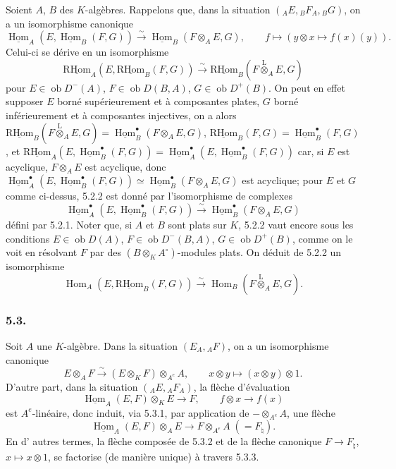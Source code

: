 \documentclass[11pt]{article}
\DeclareMathOperator{\Hom}{Hom}
\newcommand{\R}{\mathrm{R}}\newcommand{\RHomCore}{\mathrm{RHom}}
\newcommand{\ob}{\operatorname{ob}}
\providecommand{\RHom}{\RHomCore}
\providecommand{\uRHom}{\underline{\RHom}}
\providecommand{\uHom}{\underline{\Hom}}
\providecommand{\lten}{\overset{\mathrm L}{\otimes}}
\providecommand{\RHom}{\RHomCore}
\providecommand{\Hom}{\operatorname{Hom}}
\providecommand{\ob}{\operatorname{ob}}
\providecommand{\lten}{\overset{\mathrm L}{\otimes}}
\providecommand{\RHom}{\R\mathcal{H}om}
\providecommand{\lten}{\overset{\mathrm L}{\otimes}}
\providecommand{\R}{\mathrm R}
\providecommand{\lten}{\overset{\mathrm L}{\otimes}}
\providecommand{\lten}{\overset{\mathrm L}{\otimes}}
\providecommand{\lten}{\overset{\mathrm L}{\otimes}}
\providecommand{\RHom}{\RHomCore}
\providecommand{\Hom}{\operatorname{Hom}}
\providecommand{\lten}{\overset{\mathrm L}{\otimes}}
\begin{document}
Soient $A$, $B$ des $K$-algèbres. Rappelons que, dans la situation $({}_AE,{}_BF_A,{}_BG)$, on a un isomorphisme canonique
\begin{equation}\tag{5.2.1}
\uHom_A(E,\uHom_B(F,G))\xrightarrow{\sim}\uHom_B(F\otimes_AE,G),\qquad
f\longmapsto (y\otimes x\longmapsto f(x)(y)).
\end{equation}
Celui-ci se dérive en un isomorphisme
\begin{equation}\tag{5.2.2}
\uRHom_A(E,\uRHom_B(F,G))\xrightarrow{\sim}\uRHom_B(F\lten_AE,G)
\end{equation}
pour $E\in\ob D^-(A)$, $F\in\ob D(B,A)$, $G\in\ob D^+(B)$. On peut en effet supposer $E$ borné supérieurement et à composantes plates, $G$ borné inférieurement et à composantes injectives, on a alors $\uRHom_B(F\lten_AE,G)=\uHom_B^\bullet(F\otimes_AE,G)$, $\uRHom_B(F,G)=\uHom_B^\bullet(F,G)$, et $\uRHom_A(E,\uHom_B^\bullet(F,G))=\uHom_A^\bullet(E,\uHom_B^\bullet(F,G))$ car, si $E$ est acyclique, $F\otimes_AE$ est acyclique, donc $\uHom_A^\bullet(E,\uHom_B^\bullet(F,G))\simeq\uHom_B^\bullet(F\otimes_AE,G)$ est acyclique; pour $E$ et $G$ comme ci-dessus, 5.2.2 est donné par l'isomorphisme de complexes
\[
\uHom_A^\bullet(E,\uHom_B^\bullet(F,G))\xrightarrow{\sim}\uHom_B^\bullet(F\otimes_AE,G)
\]
défini par 5.2.1. Noter que, si $A$ et $B$ sont plats sur $K$, 5.2.2 vaut encore sous les conditions $E\in\ob D(A)$, $F\in\ob D^-(B,A)$, $G\in\ob D^+(B)$, comme on le voit en résolvant $F$ par des $(B\otimes_KA^\circ)$-modules plats. On déduit de 5.2.2 un isomorphisme
\begin{equation}\tag{5.2.3}
\Hom_A(E,\uRHom_B(F,G))\xrightarrow{\sim}\Hom_B(F\lten_AE,G).
\end{equation}

\subsubsection*{5.3.}

Soit $A$ une $K$-algèbre. Dans la situation $(E_A,{}_AF)$, on a un isomorphisme canonique
\begin{equation}\tag{5.3.1}
E\otimes_AF\xrightarrow{\sim}(E\otimes_KF)\otimes_{A^e}A,
\qquad x\otimes y\longmapsto (x\otimes y)\otimes 1.
\end{equation}
D'autre part, dans la situation $({}_AE,{}_AF_A)$, la flèche d'évaluation
\begin{equation}\tag{5.3.2}
\uHom_A(E,F)\otimes_KE\longrightarrow F,
\qquad f\otimes x\longrightarrow f(x)
\end{equation}
est $A^e$-linéaire, donc induit, via 5.3.1, par application de $-\otimes_{A^e}A$, une flèche
\begin{equation}\tag{5.3.3}
\uHom_A(E,F)\otimes_AE\longrightarrow F\otimes_{A^e}A\;(=F_\natural).
\end{equation}
En d'%
autres termes, la flèche composée de 5.3.2 et de la flèche canonique $F\to F_\natural$, $x\mapsto x\otimes 1$, se factorise (de manière unique) à travers 5.3.3.
\end{document}
